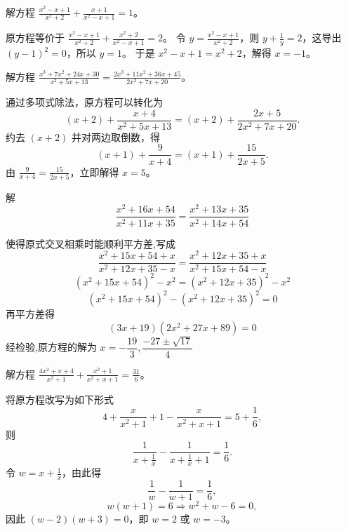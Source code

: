 \begin{questions}
\question 解方程 $\frac{x^2 - x + 1}{x^2 + 2} + \frac{x + 1}{x^2 - x + 1} = 1$。

\begin{solution}
原方程等价于 $\frac{x^2 - x + 1}{x^2 + 2} + \frac{x^2 + 2}{x^2 - x + 1} = 2$。
令 $y = \frac{x^2 - x + 1}{x^2 + 2}$，则 $y + \frac{1}{y} = 2$，这导出 $(y - 1)^2 = 0$，所以 $y = 1$。
于是 $x^2 - x + 1 = x^2 + 2$，解得 $x = -1$。
\end{solution}

\question 解方程 $\frac{x^3 + 7x^2 + 24x + 30}{x^2 + 5x + 13} = \frac{2x^3 + 11x^2 + 36x + 45}{2x^2 + 7x + 20}$。

\begin{solution}
通过多项式除法，原方程可以转化为
\[
(x + 2) + \frac{x + 4}{x^2 + 5x + 13} = (x + 2) + \frac{2x + 5}{2x^2 + 7x + 20}.
\]
约去 $(x + 2)$ 并对两边取倒数，得
\[
(x + 1) + \frac{9}{x + 4} = (x + 1) + \frac{15}{2x + 5}.
\]
由 $\frac{9}{x + 4} = \frac{15}{2x + 5}$，立即解得 $x = 5$。
\end{solution}

    \question 解
        \[
        \frac{x^2+16x+54}{x^2+11x+35} = \frac{x^2+13x+35}{x^2+14x+54}
        \]
    \begin{solution}
        使得原式交叉相乘时能顺利平方差,写成
        \[
        \frac{x^2+15x+54 + x}{x^2+12x+35 - x} = \frac{x^2+12x+35 + x}{x^2+15x+54 - x}
        \]
        \[
        (x^2+15x+54)^2 - x^2 = (x^2+12x+35)^2 - x^2
        \]
        \[
        (x^2+15x+54)^2 - (x^2+12x+35)^2 = 0
        \]
        再平方差得
        \[
        (3x+19)(2x^2+27x+89) = 0
        \]
        经检验,原方程的解为 $x = -\dfrac{19}{3},\dfrac{-27\pm\sqrt{17}}{4}$
    \end{solution}

    \question 解方程 $\frac{4x^2 + x + 4}{x^2 + 1} + \frac{x^2 + 1}{x^2 + x + 1} = \frac{31}{6}$。

\begin{solution}
将原方程改写为如下形式
\[
4 + \frac{x}{x^2 + 1} + 1 - \frac{x}{x^2 + x + 1} = 5 + \frac{1}{6},
\]
则
\[
\frac{1}{x + \frac{1}{x}} - \frac{1}{x + \frac{1}{x} + 1} = \frac{1}{6}.
\]
令 $w = x + \frac{1}{x}$，由此得
\[
\frac{1}{w} - \frac{1}{w + 1} = \frac{1}{6},
\]
\[
w(w + 1) = 6 \Rightarrow w^2 + w - 6 = 0,
\]
因此 $(w - 2)(w + 3) = 0$，即 $w = 2$ 或 $w = -3$。
\end{solution}
\end{questions}
